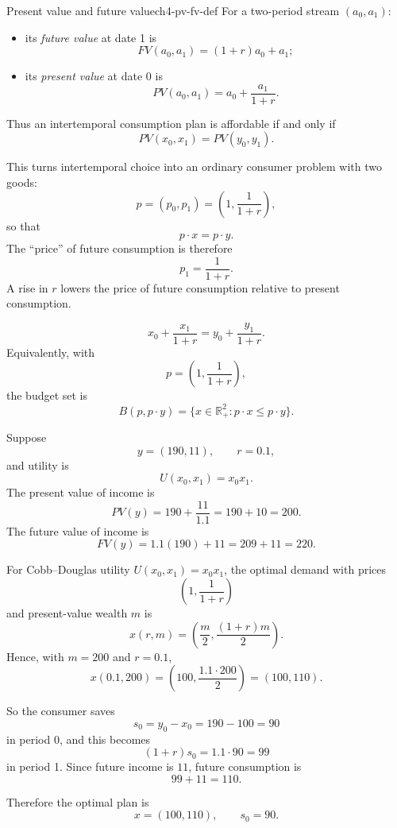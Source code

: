 \begin{definition}{Present value and future value}{ch4-pv-fv-def}
For a two-period stream $(a_0,a_1)$:
\begin{itemize}
    \item its \emph{future value} at date 1 is
    \[
    FV(a_0,a_1)=(1+r)a_0+a_1;
    \]
    \item its \emph{present value} at date 0 is
    \[
    PV(a_0,a_1)=a_0+\frac{a_1}{1+r}.
    \]
\end{itemize}
Thus an intertemporal consumption plan is affordable if and only if
\[
PV(x_0,x_1)=PV(y_0,y_1).
\]
\end{definition}

This turns intertemporal choice into an ordinary consumer problem with two goods:
\[
p=(p_0,p_1)=\left(1,\frac{1}{1+r}\right),
\]
so that
\[
p\cdot x = p\cdot y.
\]
The ``price'' of future consumption is therefore
\[
p_1=\frac{1}{1+r}.
\]
A rise in $r$ lowers the price of future consumption relative to present consumption.

\begin{keyformula}[title={Key Formula: Two-Period Intertemporal Budget}]
\[
x_0+\frac{x_1}{1+r}=y_0+\frac{y_1}{1+r}.
\]
Equivalently, with
\[
p=\left(1,\frac{1}{1+r}\right),
\]
the budget set is
\[
B(p,p\cdot y)=\{x\in \mathbb{R}_+^2 : p\cdot x \le p\cdot y\}.
\]
\end{keyformula}

\begin{examplebox}[title={Worked Example: present value, future value, and saving}]
Suppose
\[
y=(190,11), \qquad r=0.1,
\]
and utility is
\[
U(x_0,x_1)=x_0x_1.
\]
The present value of income is
\[
PV(y)=190+\frac{11}{1.1}=190+10=200.
\]
The future value of income is
\[
FV(y)=1.1(190)+11=209+11=220.
\]

For Cobb--Douglas utility $U(x_0,x_1)=x_0x_1$, the optimal demand with prices
\[
\left(1,\frac{1}{1+r}\right)
\]
and present-value wealth $m$ is
\[
x(r,m)=\left(\frac{m}{2},\frac{(1+r)m}{2}\right).
\]
Hence, with $m=200$ and $r=0.1$,
\[
x(0.1,200)=\left(100,\frac{1.1\cdot 200}{2}\right)=(100,110).
\]

So the consumer saves
\[
s_0=y_0-x_0=190-100=90
\]
in period 0, and this becomes
\[
(1+r)s_0=1.1\cdot 90=99
\]
in period 1. Since future income is $11$, future consumption is
\[
99+11=110.
\]

Therefore the optimal plan is
\[
\boxed{x=(100,110), \qquad s_0=90.}
\]
\end{examplebox}

